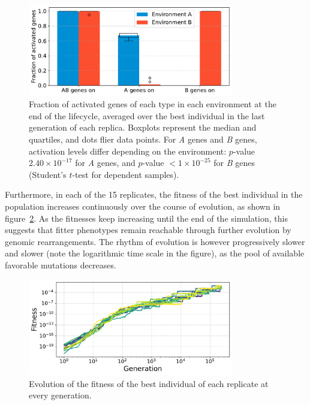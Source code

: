 \begin{figure}[H]
  \centering
\includegraphics[width=0.8\textwidth]{alife/img/mean_activation.pdf}
\caption[Fraction of activated genes of each type at the end of evolution in the proof-of-concept model]{Fraction of activated genes of each type in each environment at the end of the lifecycle, averaged over the best individual in the last generation of each replica.
  Boxplots represent the median and quartiles, and dots flier data points.
  For \emph{A} genes and \emph{B} genes, activation levels differ depending on the environment: $p$-value $2.40\times10^{-17}$ for \emph{A} genes, and $p$-value $<1\times10^{-25}$ for \emph{B} genes (Student's $t$-test for dependent samples).}
  \label{fig:alife:mean_activ}
\end{figure}

Furthermore, in each of the 15 replicates, the fitness of the best individual in the population increases continuously over the course of evolution, as shown in figure~\ref{fig:alife:fitnesses}.
As the fitnesses keep increasing until the end of the simulation, this suggests that fitter phenotypes remain reachable through further evolution by genomic rearrangements.
The rhythm of evolution is however progressively slower and slower (note the logarithmic time scale in the figure), as the pool of available favorable mutations decreases.

\begin{figure}[H]
  \centering
  \includegraphics[width=0.8\textwidth]{alife/img/all_fitness.pdf}
  \caption[Fitness of every replicate during evolution in the proof-of-concept model]{Evolution of the fitness of the best individual of each replicate at every generation.}
  \label{fig:alife:fitnesses}
\end{figure}

